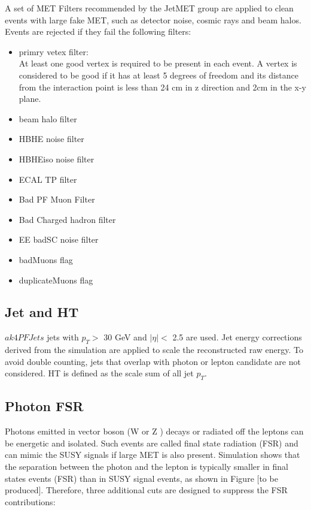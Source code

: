 \documentclass[thesis.tex]{subfiles}
\renewcommand\_{\textunderscore\allowbreak}
\begin{document}
A set of MET Filters recommended by the JetMET group are applied to clean events with large fake MET, such as detector noise, cosmic rays and beam halos. Events are rejected if they fail the following filters:

\begin{center}
\begin{itemize}
\item primry vetex filter:\\
		At least one good vertex is required to be present in each event. A vertex is considered to be good if it has at least 5 degrees of freedom and its distance from the interaction point is less than 24 cm in z direction and 2cm in the x-y plane. 
\item beam halo filter
\item HBHE noise filter
\item HBHEiso noise filter
\item ECAL TP filter
\item Bad PF Muon Filter
\item Bad Charged hadron filter
\item EE badSC noise filter
\item badMuons flag
\item duplicateMuons flag
\end{itemize}
\end{center}

\subsection{Jet and HT}
\label{subsec:jetID}
$ak4PFJets$ jets \cite{CMS:AK4Jet1,CMS:AK4Jet2} with $p_T >$ 30 GeV and $ |\eta| <$ 2.5 are used. Jet energy corrections \cite{CMS:JES} derived from the simulation are applied to scale the reconstructed raw energy. To avoid double counting, jets that overlap with photon or lepton candidate are not considered. HT is defined as the scale sum of all jet $p_T$. 

\subsection{Photon FSR}
  Photons emitted in vector boson (W or Z ) decays or radiated off the leptons can be energetic and isolated. Such events are called final state radiation (FSR) and can mimic the SUSY signals if large MET is also present. Simulation shows that the separation between the photon and the lepton is typically smaller in final states events (FSR) than in SUSY signal events, as shown in Figure [to be produced]. Therefore, three additional cuts are designed to suppress the FSR contributions:
\end{document}
